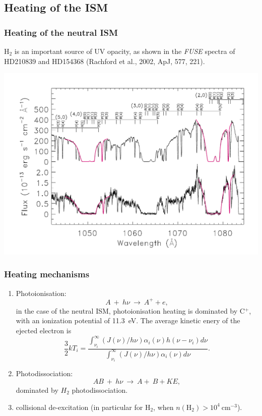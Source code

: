 \subsection{Heating of the ISM}

 \begin{frame}\frametitle{Heating of the neutral ISM}

H$_2$ is an important source of UV opacity, as shown in the {\em FUSE}
spectra of HD210839 and HD154368 (Rachford et al., 2002, ApJ, 577,
221).

\includegraphics[width=\textwidth,height=!]{./B/fuse_H2}
\vfill

\end{frame} \begin{frame}\frametitle{Heating mechanisms}

\begin{enumerate}

\item Photoionisation: 
\[A ~  + ~h\nu ~\rightarrow~ A^+ + e, \]
in the case of the neutral ISM, photoionisation heating is dominated
by C$^+$, with an ionization potential of 11.3~eV. The average kinetic
enery of the ejected electron is 
\[ \frac{3}{2}kT_i = \frac{\int_{\nu_i}^{\infty} (J(\nu)/h\nu) \alpha_i(\nu) h(\nu
-\nu_i) d\nu}{\int_{\nu_i}^{\infty} (J(\nu)/h\nu) \alpha_i(\nu)d\nu
 }. \]

\item Photodissociation: 
\[AB ~  + ~h\nu ~\rightarrow~ A +~ B + KE, \]
dominated by $H_2$ photodissociation.
\item collisional de-excitation (in particular for H$_2$, when  
$n(\mathrm{H}_2) > 10^4~$cm$^{-3}$).
\seti
\end{enumerate}


\end{frame}
